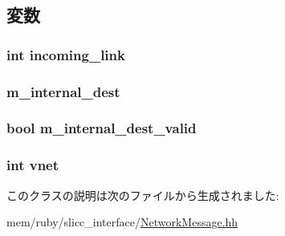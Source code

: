 \subsection{変数}
\hypertarget{classNetworkMessage_ae7c7bd0fd6c56359474754aae4107cfd}{
\subsubsection[{incoming\_\-link}]{\setlength{\rightskip}{0pt plus 5cm}int {\bf incoming\_\-link}}}
\label{classNetworkMessage_ae7c7bd0fd6c56359474754aae4107cfd}
\hypertarget{classNetworkMessage_a737600b7a1d25511b0609d6431ab26d1}{
\subsubsection[{m\_\-internal\_\-dest}]{ {\bf m\_\-internal\_\-dest}}}
\label{classNetworkMessage_a737600b7a1d25511b0609d6431ab26d1}
\hypertarget{classNetworkMessage_a6b68467ba70ed46ae387b63f06d00fe7}{
\subsubsection[{m\_\-internal\_\-dest\_\-valid}]{\setlength{\rightskip}{0pt plus 5cm}bool {\bf m\_\-internal\_\-dest\_\-valid}}}
\label{classNetworkMessage_a6b68467ba70ed46ae387b63f06d00fe7}
\hypertarget{classNetworkMessage_acc8dd50b5d5c79da5385db12c7cdd74b}{
\subsubsection[{vnet}]{\setlength{\rightskip}{0pt plus 5cm}int {\bf vnet}}}
\label{classNetworkMessage_acc8dd50b5d5c79da5385db12c7cdd74b}


このクラスの説明は次のファイルから生成されました:\begin{DoxyCompactItemize}
\item 
mem/ruby/slicc\_\-interface/\hyperlink{NetworkMessage_8hh}{NetworkMessage.hh}\end{DoxyCompactItemize}

